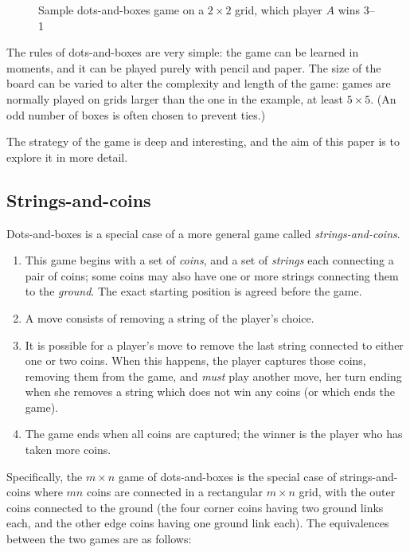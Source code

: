 \documentclass[a4paper,twocolumn]{article}
\begin{document}
\begin{figure}
  \centering
  \def\svgscale{0.7}
  
  \caption{Sample dots-and-boxes game on a $2 \times 2$ grid, which
    player $A$ wins 3--1}
  \label{sampledab}
\end{figure}

The rules of dots-and-boxes are very simple: the game can be learned
in moments, and it can be played purely with pencil and paper. The
size of the board can be varied to alter the complexity and length of
the game: games are normally played on grids larger than the one in
the example, at least $5 \times 5$. (An odd number of boxes is often
chosen to prevent ties.)

The strategy of the game is deep and interesting, and the aim of this
paper is to explore it in more detail.

\subsection{Strings-and-coins}

Dots-and-boxes is a special case of a more general game called
\emph{strings-and-coins}.

\begin{enumerate}
  \item This game begins with a set of \emph{coins}, and a set of
    \emph{strings} each connecting a pair of coins; some coins may
    also have one or more strings connecting them to the
    \emph{ground}. The exact starting position is agreed before the
    game.
  \item A move consists of removing a string of the player's choice.
  \item It is possible for a player's move to remove the last string
    connected to either one or two coins. When this happens, the
    player captures those coins, removing them from the game, and
    \emph{must} play another move, her turn ending when she removes a
    string which does not win any coins (or which ends the game).
  \item The game ends when all coins are captured; the winner is the
    player who has taken more coins.
\end{enumerate}

Specifically, the $m \times n$ game of dots-and-boxes is the special
case of strings-and-coins where $mn$ coins are connected in a
rectangular $m \times n$ grid, with the outer coins connected to the
ground (the four corner coins having two ground links each, and the
other edge coins having one ground link each). The equivalences
between the two games are as follows:
\end{document}
